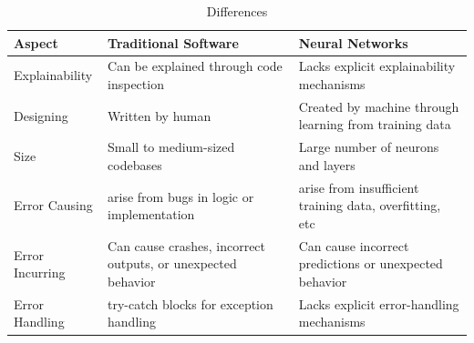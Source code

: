 \documentclass[oneside,11pt,dvipsnames]{book}
\numberwithin{equation}{section}
\theoremstyle{definition}
\theoremstyle{remark}
\begin{document}
\begin{table}
    \caption{Differences}\label{tab:nn-software-differences}
    \scriptsize
    \centering
\begin{tabular}{l|l|l}
    \toprule
    Aspect	& Traditional Software	& Neural Networks \\
    \midrule
    Explainability & Can be explained through code inspection & Lacks explicit explainability mechanisms\\
    Designing &	Written by human & Created by machine through learning from training data\\
    Size & Small to medium-sized codebases & Large number of neurons and layers\\
    Error Causing & arise from bugs in logic or implementation & arise from insufficient training data, overfitting, etc\\
    Error Incurring & Can cause crashes, incorrect outputs, or unexpected behavior & Can cause incorrect predictions or unexpected behavior\\
    Error Handling & try-catch blocks for exception handling &	Lacks explicit error-handling mechanisms\\

\end{tabular}
\end{table}
\end{document}
